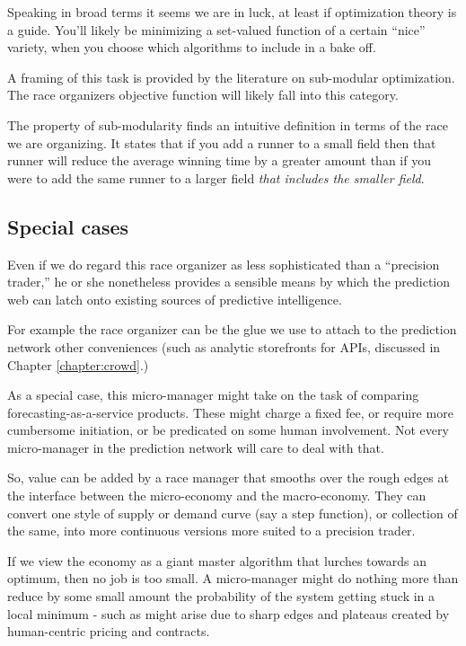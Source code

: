 Speaking in broad terms it seems we are in luck, at least if optimization theory is a guide. You'll likely be minimizing a set-valued function of a certain ``nice'' variety, when you choose which algorithms to include in a bake off.

A framing of this task is provided by the literature on sub-modular optimization. The race organizers objective function will likely fall into this category. 

The property of sub-modularity finds an intuitive definition in terms of the race we are organizing. It states that if you add a runner to a small field then that runner will reduce the average winning time by a greater amount than if you were to add the same runner to a larger field {\em that includes the smaller field}.


\subsection{Special cases}

Even if we do regard this race organizer as less sophisticated than a ``precision trader,'' he or she nonetheless provides a sensible means by which the prediction web can latch onto existing sources of predictive intelligence. 

For example the race organizer can be the glue we use to attach to the prediction network other conveniences (such as analytic storefronts for APIs, discussed in Chapter \ref{chapter:crowd}.) 


As a special case, this micro-manager might take on the task of comparing forecasting-as-a-service products. These might charge a fixed fee, or require more cumbersome initiation, or be predicated on some human involvement. Not every micro-manager in the prediction network will care to deal with that. 

So, value can be added by a race manager that smooths over the rough edges at the interface between the micro-economy and the macro-economy. They can convert one style of supply or demand curve (say a step function), or collection of the same, into more continuous versions more suited to a precision trader. 

If we view the economy as a giant master algorithm that lurches towards an optimum, then no job is too small. A micro-manager might do nothing more than reduce by some small amount the probability of the system getting stuck in a local minimum - such as might arise due to sharp edges and plateaus created by human-centric pricing and contracts.

